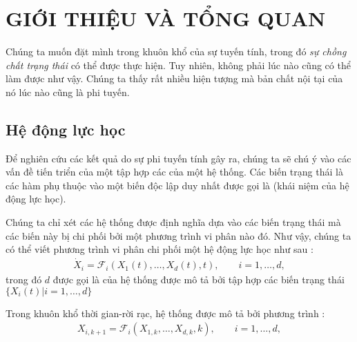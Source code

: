 \documentclass[CHAY_ROI.tex]{subfiles}
\begin{document}
\chapter{GIỚI THIỆU VÀ TỔNG QUAN}
Chúng ta muốn đặt mình trong khuôn khổ của sự tuyến tính, trong đó \emph{sự chồng chất trạng thái} có thể được thực hiện. Tuy nhiên, không phải lúc nào cũng có thể làm được như vậy. Chúng ta thấy rất nhiều hiện tượng mà bản chất nội tại của nó lúc nào cũng là phi tuyến. 
\section{Hệ động lực học}
Để nghiên cứu các kết quả do sự phi tuyến tính gây ra, chúng ta sẽ chú ý vào các vấn đề tiến triển của một tập hợp các  của một hệ thống. Các biến trạng thái là các hàm phụ thuộc vào một biến độc lập duy nhất được gọi là  (khái niệm của hệ động lực học). 

Chúng ta chỉ xét các hệ thống được định nghĩa dựa vào các biến trạng thái mà các biến này bị chi phối bởi một phương trình vi phân nào đó. Như vậy, chúng ta có thể viết phương trình vi phân chi phối một hệ động lực học như sau :
\begin{equation}
    \begin{aligned}
        \dot{X}_i=\mathcal{F}_i(X_1(t),\dots,X_d(t),t),\qquad i=1,\dots,d,
    \end{aligned}
\end{equation}
trong đó $d$ được gọi là  của hệ thống được mô tả bởi tập hợp các biến trạng thái $\{X_i(t)|i=1,\dots,d\}$

Trong khuôn khổ thời gian-rời rạc, hệ thống được mô tả bởi phương trình :
\begin{equation}
    \begin{aligned}
        X_{i,k+1}=\mathcal{F}_i(X_{1,k},\dots,X_{d,k},k),\qquad i=1,\dots,d,
    \end{aligned}
\end{equation}
\end{document}
